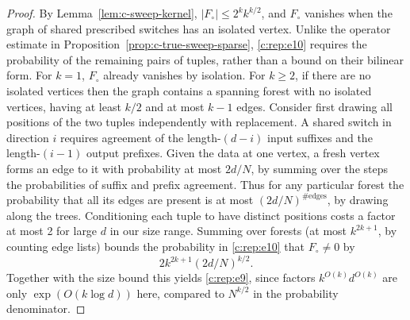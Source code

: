 \begin{proof}
By Lemma~\ref{lem:c-sweep-kernel}, $|F_\circ|\le2^kk^{k/2}$,
and $F_\circ$ vanishes when the graph of shared prescribed switches
has an isolated vertex. Unlike the operator estimate in
Proposition~\ref{prop:c-true-sweep-sparse}, \eqref{c:rep:e10} requires
the probability of the remaining pairs of tuples, rather than a
bound on their bilinear form.
For \(k=1\), \(F_\circ\) already vanishes by isolation. For \(k\ge 2\), if there are no
isolated vertices then the graph contains a spanning forest with no isolated vertices, having
at least \(k/2\) and at most \(k-1\) edges. Consider first drawing all positions of the two
tuples independently with replacement. A shared switch in direction $i$
requires agreement of the length-$(d-i)$ input suffixes and the
length-$(i-1)$ output prefixes. Given the data at one vertex, a fresh vertex forms an
edge to it with probability at most \(2d/N\), by summing over the steps the probabilities of
suffix and prefix agreement. Thus for any particular forest the probability that all its edges
are present is at most \((2d/N)^{\#\text{edges}}\), by drawing along the trees. Conditioning
each tuple to have distinct positions costs a factor at most 2 for large \(d\) in our size
range. Summing over forests (at most \(k^{2k+1}\), by counting edge lists) bounds the
probability in \eqref{c:rep:e10} that \(F_\circ\ne 0\) by
\[
2 k^{2k+1}(2d/N)^{k/2}.
\]
Together with the size bound this yields \eqref{c:rep:e9}, since factors \(k^{O(k)}d^{O(k)}\)
are only \(\exp(O(k\log d))\) here, compared to \(N^{k/2}\) in the probability denominator.
\end{proof}

